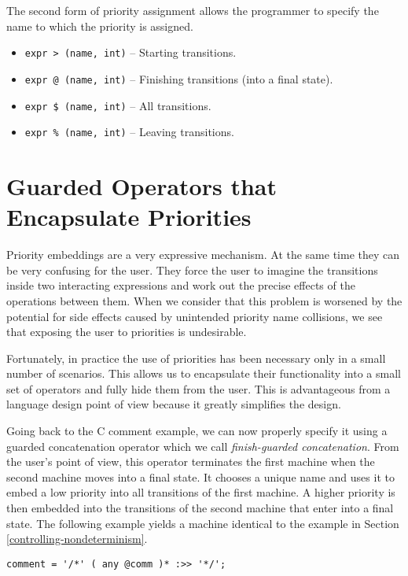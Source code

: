 \documentclass[letterpaper,11pt,oneside]{book}
\newenvironment{inline_code}{\def\baselinestretch{1}\vspace{12pt}\small}{}
\begin{document}
The second form of priority assignment allows the programmer to specify the name
to which the priority is assigned.

\begin{itemize}
\setlength{\parskip}{0in}
\item \verb|expr > (name, int)| -- Starting transitions.
\item \verb|expr @ (name, int)| -- Finishing transitions (into a final state).
\item \verb|expr $ (name, int)| -- All transitions.
\item \verb|expr % (name, int)| -- Leaving transitions.
\end{itemize}

\section{Guarded Operators that Encapsulate Priorities}

Priority embeddings are a very expressive mechanism. At the same time they
can be very confusing for the user. They force the user to imagine
the transitions inside two interacting expressions and work out the precise
effects of the operations between them. When we consider
that this problem is worsened by the
potential for side effects caused by unintended priority name collisions, we
see that exposing the user to priorities is undesirable.

Fortunately, in practice the use of priorities has been necessary only in a
small number of scenarios.  This allows us to encapsulate their functionality
into a small set of operators and fully hide them from the user. This is
advantageous from a language design point of view because it greatly simplifies
the design.  

Going back to the C comment example, we can now properly specify
it using a guarded concatenation operator which we call {\em finish-guarded
concatenation}. From the user's point of view, this operator terminates the
first machine when the second machine moves into a final state.  It chooses a
unique name and uses it to embed a low priority into all
transitions of the first machine. A higher priority is then embedded into the
transitions of the second machine that enter into a final state. The following
example yields a machine identical to the example in Section 
\ref{controlling-nondeterminism}.

\begin{inline_code}
\begin{verbatim}
comment = '/*' ( any @comm )* :>> '*/';
\end{verbatim}
\end{inline_code}
\end{document}
